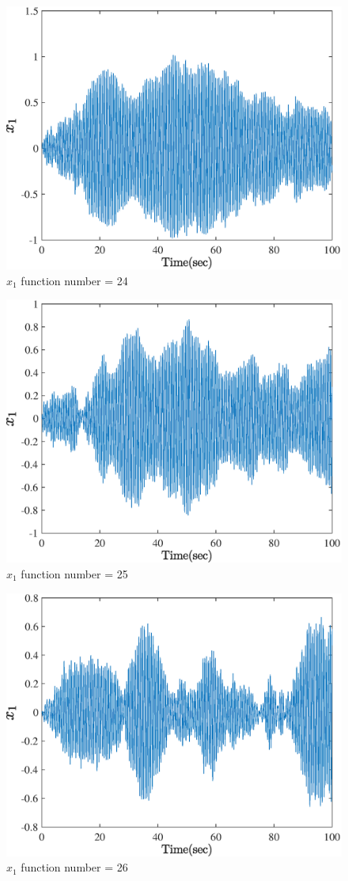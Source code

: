   \begin{figure}[H] 
  	\caption{$x_1$ function number = 24} 
  	\centering 
  	\includegraphics[width=12cm]{../Figure/Q5/part_a/24} 
  \end{figure}
  \begin{figure}[H] 
  	\caption{$x_1$ function number = 25} 
  	\centering 
  	\includegraphics[width=12cm]{../Figure/Q5/part_a/25} 
  \end{figure}
  \begin{figure}[H] 
  	\caption{$x_1$ function number = 26} 
  	\centering 
  	\includegraphics[width=12cm]{../Figure/Q5/part_a/26} 
  \end{figure}
